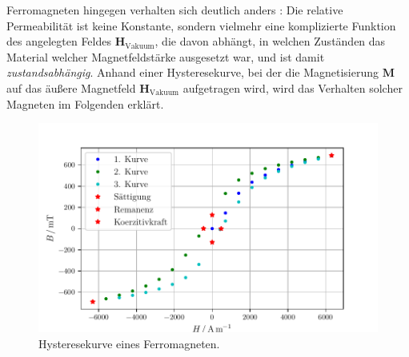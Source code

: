 Ferromagneten 
hingegen verhalten sich deutlich anders
: Die relative Permeabilität ist keine Konstante, sondern vielmehr 
eine komplizierte Funktion des angelegten Feldes $\symbf{H}_\text{Vakuum}$, die %
davon abhängt, in welchen Zuständen das Material welcher Magnetfeldstärke ausgesetzt war, und ist damit \textit{zustandsabhängig}. %
Anhand einer Hysteresekurve, bei der die Magnetisierung $\symbf{M}$ auf das äußere Magnetfeld $\symbf{H}_\text{Vakuum}$ 
aufgetragen wird, wird das Verhalten solcher Magneten im Folgenden erklärt. 
\FloatBarrier
\begin{figure}
    \centering
    \includegraphics{plot_Hysterese.pdf}
    \caption{Hysteresekurve eines Ferromagneten.}
    \label{fig:hysterese}
\end{figure}
\FloatBarrier

